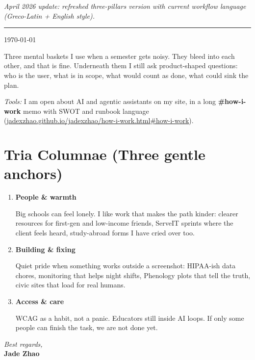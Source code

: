 \documentclass[11pt]{article}
\begin{document}

\vspace{0.35em}
\noindent\textit{April 2026 update: refreshed three-pillars version with current workflow language (Greco-Latin + English style).}

\vspace{0.5em}
\noindent\rule{\linewidth}{1pt}
\vspace{0.5em}

\noindent\today

\vspace{0.75em}

\noindent
Three mental baskets I use when a semester gets noisy. They bleed into each other, and that is fine. Underneath them I still ask product-shaped questions: who is the user, what is in scope, what would count as done, what could sink the plan.

\noindent\textit{Tools:} I am open about AI and agentic assistants on my site, in a long \textbf{\#how-i-work} memo with SWOT and runbook language (\href{https://jadexzhao.github.io/jadexzhao/how-i-work.html\#how-i-work}{jadexzhao.github.io/jadexzhao/how-i-work.html\#how-i-work}).

\section*{Tria Columnae (Three gentle anchors)}

\begin{enumerate}
    \item \textbf{People \& warmth}

    Big schools can feel lonely. I like work that makes the path kinder: clearer resources for first-gen and low-income friends, ServeIT sprints where the client feels heard, study-abroad forms I have cried over too.

    \item \textbf{Building \& fixing}

    Quiet pride when something works outside a screenshot: HIPAA-ish data chores, monitoring that helps night shifts, Phenology plots that tell the truth, civic sites that load for real humans.

    \item \textbf{Access \& care}

    WCAG as a habit, not a panic. Educators still inside AI loops. If only some people can finish the task, we are not done yet.
\end{enumerate}

\vspace{1em}
\noindent\textit{Best regards,}\\
\textbf{Jade Zhao}
\end{document}

